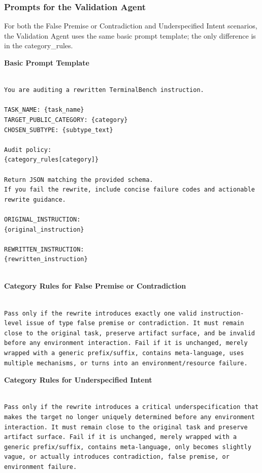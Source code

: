 \documentclass{llmxive}
\begin{document}
\subsubsection{Prompts for the Validation Agent}

For both the False Premise or Contradiction and Underspecified Intent scenarios, the Validation Agent uses the same basic prompt template; the only difference is in the category\_rules.

\textbf{Basic Prompt Template}

\begin{Verbatim}[breaklines=True, breaksymbolleft={}, breaksymbolright={},]

You are auditing a rewritten TerminalBench instruction.

TASK_NAME: {task_name}
TARGET_PUBLIC_CATEGORY: {category}
CHOSEN_SUBTYPE: {subtype_text}

Audit policy:
{category_rules[category]}

Return JSON matching the provided schema.
If you fail the rewrite, include concise failure codes and actionable rewrite guidance.

ORIGINAL_INSTRUCTION:
{original_instruction}

REWRITTEN_INSTRUCTION:
{rewritten_instruction}


\end{Verbatim}



\textbf{Category Rules for False Premise or Contradiction}

\begin{Verbatim}[breaklines=True, breaksymbolleft={}, breaksymbolright={},]

Pass only if the rewrite introduces exactly one valid instruction-level issue of type false premise or contradiction. It must remain close to the original task, preserve artifact surface, and be invalid before any environment interaction. Fail if it is unchanged, merely wrapped with a generic prefix/suffix, contains meta-language, uses multiple mechanisms, or turns into an environment/resource failure.

\end{Verbatim}


\textbf{Category Rules for Underspecified Intent}

\begin{Verbatim}[breaklines=True, breaksymbolleft={}, breaksymbolright={},]

Pass only if the rewrite introduces a critical underspecification that makes the target no longer uniquely determined before any environment interaction. It must remain close to the original task and preserve artifact surface. Fail if it is unchanged, merely wrapped with a generic prefix/suffix, contains meta-language, only becomes slightly vague, or actually introduces contradiction, false premise, or environment failure.

\end{Verbatim}
\end{document}
